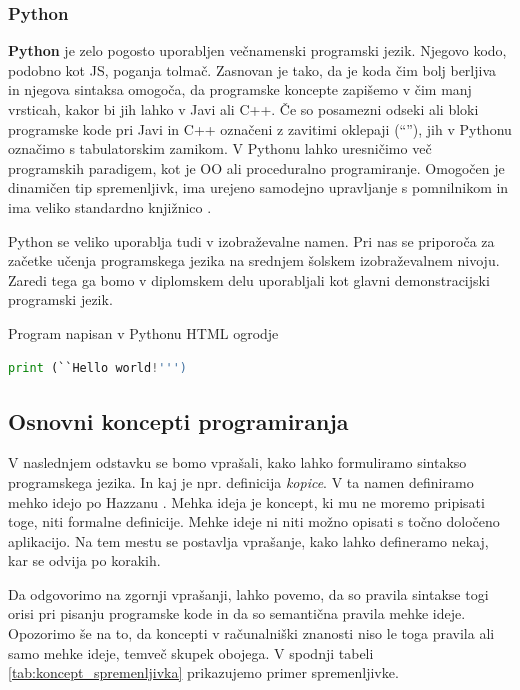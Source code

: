 \subsubsection{Python}
\label{sec:pj_python}

\textbf{Python} je zelo pogosto uporabljen večnamenski programski
jezik. Njegovo kodo, podobno kot JS, poganja tolmač. Zasnovan je tako,
da je koda čim bolj berljiva in njegova sintaksa omogoča, da
programske koncepte zapišemo v čim manj vrsticah, kakor bi jih lahko v
Javi ali C++. Če so posamezni odseki ali bloki programske kode pri
Javi in C++ označeni z zavitimi oklepaji (``{}''), jih v Pythonu
označimo s tabulatorskim zamikom. V Pythonu lahko uresničimo več
programskih paradigem, kot je OO ali proceduralno
programiranje. Omogočen je dinamičen tip spremenljivk, ima urejeno
samodejno upravljanje s pomnilnikom in ima veliko standardno
knjižnico \cite{wiki:python}.

Python se veliko uporablja tudi v izobraževalne namen. Pri nas se
priporoča za začetke učenja programskega jezika na srednjem šolskem
izobraževalnem nivoju. Zaredi tega ga bomo v diplomskem delu
uporabljali kot glavni demonstracijski programski jezik.

\begin{examplebox}[label={prog:py01}]{Program napisan v Pythonu
    HTML ogrodje}
\begin{lstlisting}[language=Python]
print (``Hello world!''')
\end{lstlisting}
\end{examplebox}

\subsection{Osnovni koncepti programiranja}
\label{sec:Osnvni koncepti_programiranja}

V naslednjem odstavku se bomo vprašali, kako lahko formuliramo sintakso
programskega jezika. In kaj je npr. definicija \emph{kopice}. V ta
namen definiramo mehko idejo po Hazzanu \cite{guideTCS}. Mehka ideja je koncept, ki mu ne moremo pripisati toge,
niti formalne definicije. Mehke ideje ni niti možno opisati s točno
določeno aplikacijo. Na tem mestu se postavlja vprašanje, kako lahko
defineramo nekaj, kar se odvija po korakih.

Da odgovorimo na zgornji vprašanji, lahko povemo, da so pravila
sintakse togi orisi pri pisanju programske kode in da so semantična
pravila mehke ideje. Opozorimo še na to, da koncepti v računalniški
znanosti niso le toga pravila ali samo mehke ideje, temveč skupek
obojega. V spodnji tabeli \ref{tab:koncept_spremenljivka} prikazujemo
primer spremenljivke.

